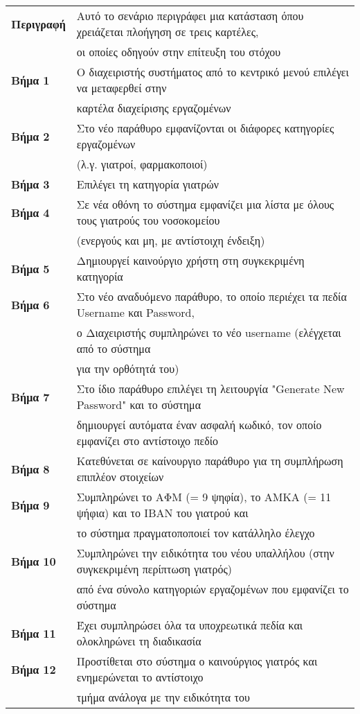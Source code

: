 \documentclass{article}
\newcommand\T{\rule{0pt}{2.6ex}}       %
\newcommand\B{\rule[-1.2ex]{0pt}{0pt}}
\begin{document}
 \begin{center}
     \begin{tabular}{|l|l|}
     \hline
      \textbf{Περιγραφή} & Αυτό το σενάριο περιγράφει μια κατάσταση όπου χρειάζεται πλοήγηση σε τρεις καρτέλες, \T \\& οι οποίες οδηγούν στην επίτευξη του στόχου \B \\ 
      \hline
      \textbf{Βήμα 1} & Ο διαχειριστής συστήματος από το κεντρικό μενού επιλέγει να μεταφερθεί στην \T \\& καρτέλα διαχείρισης εργαζομένων \T\B \\
      \hline
      \textbf{Βήμα 2} & Στο νέο παράθυρο εμφανίζονται οι διάφορες κατηγορίες εργαζομένων \T \\& (λ.γ. γιατροί, φαρμακοποιοί) \B \\
      \hline
      \textbf{Βήμα 3} & Επιλέγει τη κατηγορία γιατρών \T\B \\
      \hline
      \textbf{Βήμα 4} & Σε νέα οθόνη το σύστημα εμφανίζει μια λίστα με όλους τους γιατρούς του νοσοκομείου \T \\& (ενεργούς και μη, με αντίστοιχη ένδειξη) \B \\
      \hline
      \textbf{Βήμα 5} & Δημιουργεί καινούργιο χρήστη στη συγκεκριμένη κατηγορία \T\B \\
      \hline
      \textbf{Βήμα 6} & Στο νέο αναδυόμενο παράθυρο, το οποίο περιέχει τα πεδία Username και Password, \T \\& ο Διαχειριστής συμπληρώνει το νέο username (ελέγχεται από το σύστημα \\& για την ορθότητά του) \B \\
      \hline
      \textbf{Βήμα 7} & Στο ίδιο παράθυρο επιλέγει τη λειτουργία "Generate New Password" και το σύστημα \T \\& δημιουργεί αυτόματα έναν ασφαλή κωδικό, τον οποίο εμφανίζει στο αντίστοιχο πεδίο\B \\
      \hline
       \textbf{Βήμα 8} & Κατεθύνεται σε καίνουργιο παράθυρο για τη συμπλήρωση επιπλέον στοιχείων \T\B \\
      \hline
      \textbf{Βήμα 9} & Συμπληρώνει το ΑΦΜ (= 9 ψηφία), το ΑΜΚΑ (= 11 ψήφια) και το IBAN του γιατρού και \T \\& το σύστημα πραγματοποποιεί τον κατάλληλο έλεγχο \B \\
      \hline
      \textbf{Βήμα 10} & Συμπληρώνει την ειδικότητα του νέου υπαλλήλου (στην συγκεκριμένη περίπτωση γιατρός) \T \\& από ένα σύνολο κατηγοριών εργαζομένων που εμφανίζει το σύστημα \B \\
      \hline
      \textbf{Βήμα 11} & Έχει συμπληρώσει όλα τα υποχρεωτικά πεδία και ολοκληρώνει τη διαδικασία \T\B \\
      \hline
      \textbf{Βήμα 12} & Προστίθεται στο σύστημα ο καινούργιος γιατρός και ενημερώνεται το αντίστοιχο \T \\& τμήμα ανάλογα με την ειδικότητα του \B \\
      \hline
     \end{tabular}
 \end{center}
 
\end{document}
